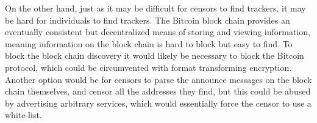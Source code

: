 On the other hand, just as it may be difficult for censors to find trackers, it may be hard for individuals to find trackers. The Bitcoin block chain provides an eventually consistent but decentralized means of storing and viewing information, meaning information on the block chain is hard to block but easy to find. To block the block chain discovery it would likely be necessary to block the Bitcoin protocol, which could be circumvented with format transforming encryption. Another option would be for censors to parse the announce messages on the block chain themselves, and censor all the addresses they find, but this could be abused by advertising arbitrary services, which would essentially force the censor to use a white-list.

